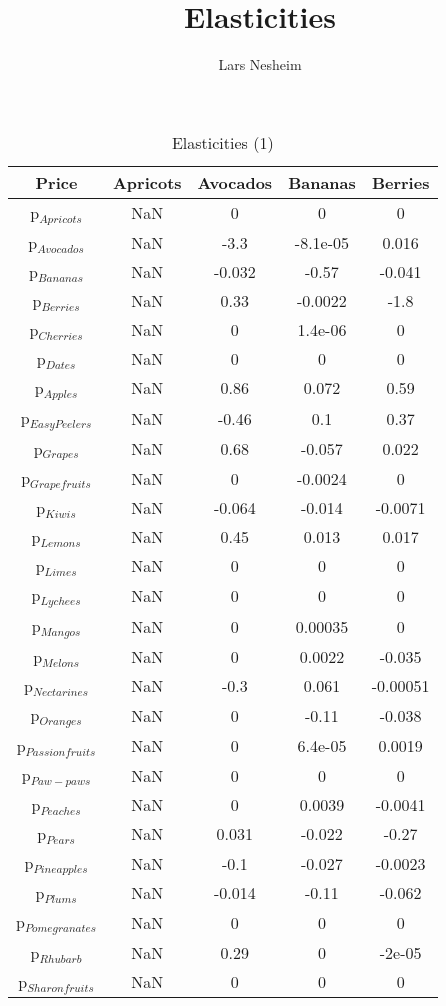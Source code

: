 \documentclass[11pt]{article}
\title{Elasticities}
\author{Lars Nesheim}
\date{}
\begin{document}
\maketitle
\begin{table}[h]
\caption{Elasticities (1)}
\label{Table: elasticities 1}
\begin{center}
\begin{tabular}{ccccc}
Price & Apricots & Avocados & Bananas & Berries \\ \hline
p$_{Apricots}$ & NaN & 0 & 0 & 0 \\ 
p$_{Avocados}$ & NaN & -3.3 & -8.1e-05 & 0.016 \\ 
p$_{Bananas}$ & NaN & -0.032 & -0.57 & -0.041 \\ 
p$_{Berries}$ & NaN & 0.33 & -0.0022 & -1.8 \\ 
p$_{Cherries}$ & NaN & 0 & 1.4e-06 & 0 \\ 
p$_{Dates}$ & NaN & 0 & 0 & 0 \\ 
p$_{Apples}$ & NaN & 0.86 & 0.072 & 0.59 \\ 
p$_{Easy Peelers}$ & NaN & -0.46 & 0.1 & 0.37 \\ 
p$_{Grapes}$ & NaN & 0.68 & -0.057 & 0.022 \\ 
p$_{Grapefruits}$ & NaN & 0 & -0.0024 & 0 \\ 
p$_{Kiwis}$ & NaN & -0.064 & -0.014 & -0.0071 \\ 
p$_{Lemons}$ & NaN & 0.45 & 0.013 & 0.017 \\ 
p$_{Limes}$ & NaN & 0 & 0 & 0 \\ 
p$_{Lychees}$ & NaN & 0 & 0 & 0 \\ 
p$_{Mangos}$ & NaN & 0 & 0.00035 & 0 \\ 
p$_{Melons}$ & NaN & 0 & 0.0022 & -0.035 \\ 
p$_{Nectarines}$ & NaN & -0.3 & 0.061 & -0.00051 \\ 
p$_{Oranges}$ & NaN & 0 & -0.11 & -0.038 \\ 
p$_{Passion fruits}$ & NaN & 0 & 6.4e-05 & 0.0019 \\ 
p$_{Paw-paws}$ & NaN & 0 & 0 & 0 \\ 
p$_{Peaches}$ & NaN & 0 & 0.0039 & -0.0041 \\ 
p$_{Pears}$ & NaN & 0.031 & -0.022 & -0.27 \\ 
p$_{Pineapples}$ & NaN & -0.1 & -0.027 & -0.0023 \\ 
p$_{Plums}$ & NaN & -0.014 & -0.11 & -0.062 \\ 
p$_{Pomegranates}$ & NaN & 0 & 0 & 0 \\ 
p$_{Rhubarb}$ & NaN & 0.29 & 0 & -2e-05 \\ 
p$_{Sharon fruits}$ & NaN & 0 & 0 & 0 \\ 
\end{tabular}
\end{center}
\end{table}
\end{document}
